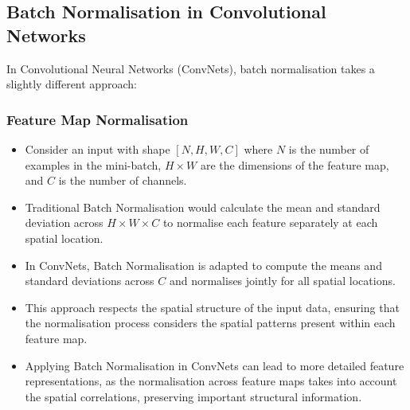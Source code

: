 \subsection{Batch Normalisation in Convolutional Networks}
In Convolutional Neural Networks (ConvNets), batch normalisation takes a slightly different approach:

\subsubsection*{Feature Map Normalisation}
\begin{itemize}
    \item Consider an input with shape \([N, H, W, C]\) where \(N\) is the number of examples in the mini-batch, \(H \times W\) are the dimensions of the feature map, and \(C\) is the number of channels.
    \item Traditional Batch Normalisation would calculate the mean and standard deviation across \(H \times W \times C\) to normalise each feature separately at each spatial location.
    \item In ConvNets, Batch Normalisation is adapted to compute the means and standard deviations across \(C\) and normalises jointly for all spatial locations.
    \item This approach respects the spatial structure of the input data, ensuring that the normalisation process considers the spatial patterns present within each feature map.
    \item Applying Batch Normalisation in ConvNets can lead to more detailed feature representations, as the normalisation across feature maps takes into account the spatial correlations, preserving important structural information.
\end{itemize}

